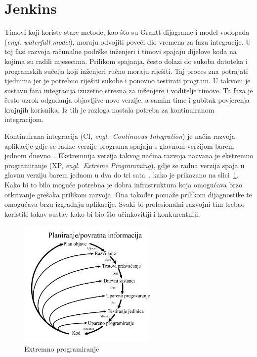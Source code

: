 \section{Jenkins}
Timovi koji koriste stare metode, kao što su Grantt dijagrame i model vodopada (\textit{engl.
waterfall model}), moraju odvojiti poveći dio vremena za fazu integracije. U toj fazi razvoja
računalne podrške inženjeri i timovi spajaju dijelove koda na kojima su radili mjesecima. Prilikom
spajanja, često dolazi do sukoba datoteka i programskih sučelja koji inženjeri ručno moraju
riješiti. Taj proces zna potrajati tjednima jer je potrebno riješiti sukobe i ponovno testirati
program. U takvom je sustavu faza integracija izuzetno stresna za inženjere i voditelje timove. Ta
faza je često uzrok odgađanja objavljive nove verzije, a samim time i gubitak povjerenja krajnjih
korisnika. Iz tih je razloga nastala potreba za kontinuiranom integracijom.

Kontinuirana integracija (CI, \textit{engl.~Continuous Integration}) je način razvoja aplikacije
gdje se radne verzije programa spajaju s glavnom verzijom barem jednom
dnevno~\citep{fowler2006continuous}. Ekstremnija verzija takvog načina razvoja nazvana je ekstremno
programiranje (XP, \textit{engl.~Extreme Programming}), gdje se radna verzija spaja u glavnu verziju
barem jednom u dva do tri sata~\citep{beck1999embracing}, kako je prikazano na slici~\ref{fig:02xp}.
Kako bi to bilo moguće potrebna je dobra infrastruktura koja omogućava brzo otkrivanje grešaka
prilikom razvoja. Ona također pomaže prilikom dijagnostike te omogućava brzu izgradnju aplikacije.
Svaki bi profesionalni razvojni tim trebao koristiti takav sustav kako bi bio što učinkovitiji i
konkurentniji.

\begin{figure}[h]
    \centering
    \includegraphics[width=0.6\textwidth]{img/02/xp.png}
    \caption{Extremno programiranje}
    \label{fig:02xp}
\end{figure}

